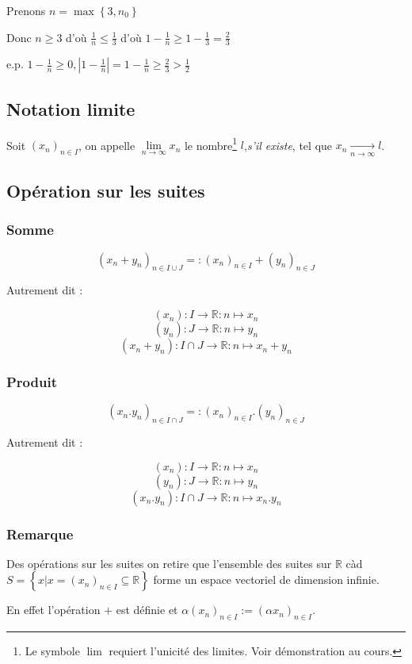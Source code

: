 \documentclass[a4paper,10pt]{article}
\newcommand{\ap}{\rightarrow}
\newcommand{\R}{\mathbb{R}}
\newcommand{\tset}[1]{\left\lbrace #1 \right\rbrace}
\newcommand{\conv}[1]{\mathop{\longrightarrow}\limits_{#1}}
\newcommand{\abs}[1]{\left\vert #1 \right\vert}
\begin{document}
Prenons $n = \max\tset{3, n_0}$

Donc $n \geq 3$ d'où $\frac{1}{n} \leq \frac{1}{3}$ d'où $1 - \frac{1}{n} \geq 1 - \frac{1}{3} = \frac{2}{3}$

e.p. $1 - \frac{1}{n} \geq 0, \abs{1-\frac{1}{n}} = 1 - \frac{1}{n} \geq \frac{2}{3} > \frac{1}{2}$

\subsection{Notation limite}
Soit $(x_n)_{n \in I}$, on appelle $\lim\limits_{n \ap \infty} x_n$ le nombre\footnote{Le symbole $\lim$ requiert l'unicité des limites. Voir démonstration au cours.} $l$,\textit{s'il existe}, tel que $x_n \conv{n \ap \infty} l$.

\subsection{Opération sur les suites}

\subsubsection{Somme}
$$(x_n + y_n)_{n \in I \cup J} =: (x_n)_{n \in I} + (y_n)_{n \in J}$$

Autrement dit :

$$(x_n) : I \ap \R : n \mapsto x_n$$
$$(y_n) : J \ap \R : n \mapsto y_n$$
$$(x_n + y_n) : I \cap J \ap \R : n \mapsto x_n + y_n$$ 


\subsubsection{Produit}
$$(x_n . y_n)_{n \in I \cap J} =: (x_n)_{n \in I} . (y_n)_{n \in J}$$

Autrement dit :

$$(x_n) : I \ap \R : n \mapsto x_n$$
$$(y_n) : J \ap \R : n \mapsto y_n$$
$$(x_n . y_n) : I \cap J \ap \R : n \mapsto x_n . y_n$$

\subsubsection{Remarque}

Des opérations sur les suites on retire que l'ensemble des suites sur $\R$ càd $S = \tset{x \vert x = (x_n)_{n \in I} \subseteq \R}$ forme un espace vectoriel de dimension infinie.

En effet l'opération $+$ est définie et $\alpha(x_n)_{n \in I} := (\alpha x_n)_{n \in I}$.
\end{document}
